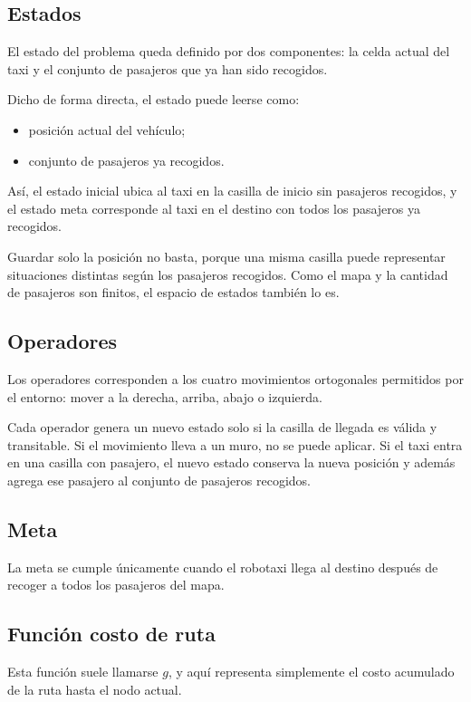 \documentclass[12pt,a4paper]{article}
\begin{document}
\subsection{Estados}
El estado del problema queda definido por dos componentes: la celda actual del taxi y el conjunto de pasajeros que ya han sido recogidos.

Dicho de forma directa, el estado puede leerse como:
\begin{itemize}
    \item posición actual del vehículo;
    \item conjunto de pasajeros ya recogidos.
\end{itemize}

Así, el estado inicial ubica al taxi en la casilla de inicio sin pasajeros recogidos, y el estado meta corresponde al taxi en el destino con todos los pasajeros ya recogidos.

Guardar solo la posición no basta, porque una misma casilla puede representar situaciones distintas según los pasajeros recogidos. Como el mapa y la cantidad de pasajeros son finitos, el espacio de estados también lo es.

\subsection{Operadores}
Los operadores corresponden a los cuatro movimientos ortogonales permitidos por el entorno: mover a la derecha, arriba, abajo o izquierda.

Cada operador genera un nuevo estado solo si la casilla de llegada es válida y transitable. Si el movimiento lleva a un muro, no se puede aplicar. Si el taxi entra en una casilla con pasajero, el nuevo estado conserva la nueva posición y además agrega ese pasajero al conjunto de pasajeros recogidos.

\subsection{Meta}
La meta se cumple únicamente cuando el robotaxi llega al destino después de recoger a todos los pasajeros del mapa.

\subsection{Función costo de ruta}
Esta función suele llamarse \(g\), y aquí representa simplemente el costo acumulado de la ruta hasta el nodo actual.
\end{document}
